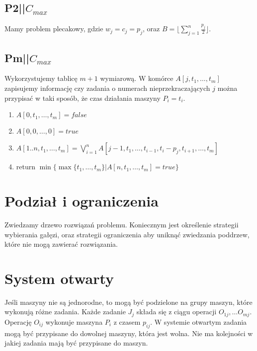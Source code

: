 \documentclass{../notatki}
\begin{document}
\subsection{P2||\texorpdfstring{$C_{max}$}{Cmax}}

Mamy problem plecakowy, gdzie $w_j = c_j = p_j$, oraz $B = \lfloor
\sum_{j=1}^{n} \frac{p_j}{2} \rfloor$.

\subsection{Pm||\texorpdfstring{$C_{max}$}{Cmax}}

Wykorzystujemy tablicę $m + 1$ wymiarową. W komórce $A[j, t_1, \dots,
t_m]$ zapisujemy informację czy zadania o numerach
nieprzekraczających $j$ można przypisać w taki sposób, że czas
działania maszyny $P_i = t_i$.

\begin{enumerate}
  \item $A[0, t_1, \dots, t_m] = false$
  \item $A[0, 0, \dots, 0] = true$
  \item $
    A[1..n, t_1, \dots, t_m] =
    \bigvee_{i=1}^{n} A[j - 1, t_1, \dots, t_{i - 1}, t_i - p_j, t_{i
    + 1}, \dots, t_m]
    $
  \item return $\min\{\max\{t_1, \dots, t_m\} | A[n, t_1, \dots, t_m] = true\}$
\end{enumerate}

\section{Podział i ograniczenia}

Zwiedzamy drzewo rozwiązań problemu. Koniecznym jest określenie strategii
wybierania gałęzi, oraz strategii ograniczenia aby uniknąć zwiedzania
poddrzew, które nie mogą zawierać rozwiązania.

\section{System otwarty}

Jeśli maszyny nie są jednorodne, to mogą być podzielone na grupy maszyn, które
wykonują różne zadania. Każde zadanie $J_j$ składa się z ciągu
operacji $O_{1j}, \dots O_{mj}$. Operację $O_{ij}$ wykonuje maszyna
$P_i$ z czasem $p_{ij}$. W systemie otwartym zadania mogą być przypisane
do dowolnej maszyny, która jest wolna. Nie ma kolejności w jakiej zadania
mają być przypisane do maszyn.
\end{document}
